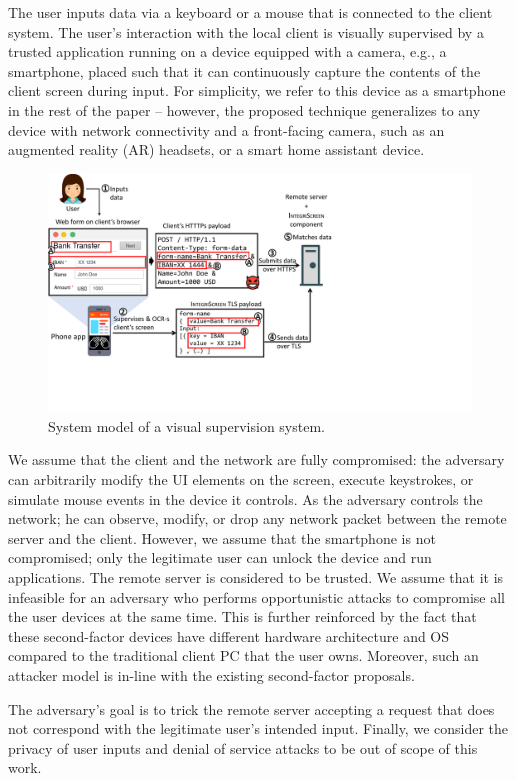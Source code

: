 The user inputs data via a keyboard or a mouse that is connected to the client system. %
The user's interaction with the local client is visually supervised by a trusted application running on a device equipped with a camera, e.g., a smartphone, placed such that it can continuously capture the contents of the client screen during input. 
For simplicity, we refer to this device as a smartphone in the rest of the paper -- however, the proposed technique generalizes to any device with network connectivity and a front-facing camera, such as an augmented reality (AR) headsets, or a smart home assistant device.

\begin{figure}[t]
	\centering
    \includegraphics[trim={0 3.7cm 11.2cm 0},clip,width=\linewidth]{chapters/IntegriScreen/newImg/overview-vertical.pdf}
	\caption{System model of a visual supervision system.}
	\label{integriscreen:fig:systemModel}
\end{figure}


We assume that the client and the network are fully compromised: the adversary can arbitrarily modify the UI elements on the screen, execute keystrokes, or simulate mouse events in the device it controls. As the adversary controls the network; he can observe, modify, or drop any network packet between the remote server and the client.
However, we assume that the smartphone is not compromised; only the legitimate user can unlock the device and run applications. The remote server is considered to be trusted. %
We assume that it is infeasible for an adversary who performs opportunistic attacks to compromise all the user devices at the same time. This is further reinforced by the fact that these second-factor devices have different hardware architecture and OS compared to the traditional client PC that the user owns. Moreover, such an attacker model is in-line with the existing second-factor proposals.

The adversary's goal is to trick the remote server accepting a request that does not correspond with the legitimate user's intended input.
Finally, we consider the privacy of user inputs and denial of service attacks to be out of scope of this work.